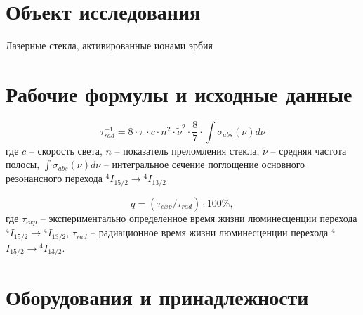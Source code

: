 \section{Объект исследования}\label{sec:object}

Лазерные стекла, активированные ионами эрбия


\section{Рабочие формулы и исходные данные}\label{sec:initial_data}


\begin{equation}
\tau{_{rad}^{-1}} = 8 \cdot \pi \cdot c
					\cdot n^2 \cdot \tilde{\nu}^2 \cdot \frac{8}{7}
					\cdot \int \sigma_{abs}(\nu)d\nu
\label{eq:F1}
\end{equation}
где $c$ – скорость света, $n$ – показатель преломления стекла,
$\tilde{\nu}$ – средняя частота полосы, $\int \sigma_{abs}(\nu)d\nu$
– интегральное сечение поглощение основного
резонансного перехода
${}^4$$I_{15/2}\rightarrow{}^4$$I_{13/2}$

\begin{equation}
q = (\tau_{exp}/\tau_{rad}) \cdot 100\%,
\label{eq:F2}
\end{equation}
где $\tau_{exp}$ – экспериментально определенное время
жизни люминесценции перехода
${}^4$$I_{15/2}\rightarrow{}^4$$I_{13/2}$,
$\tau_{rad}$ – радиационное время жизни люминесценции перехода
${}^4$$I_{15/2}\rightarrow{}^4$$I_{13/2}$.

\section{Оборудования и принадлежности}\label{sec:stuff}
